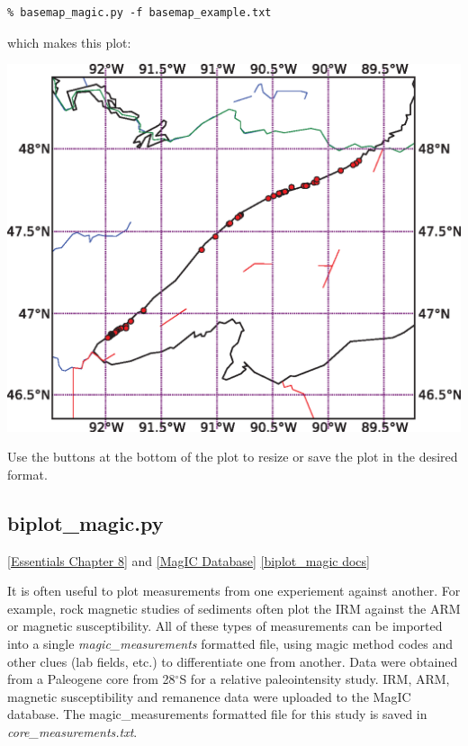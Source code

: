 \documentclass[11pt]{book}
\begin{document}
{{\begin{verbatim}
% basemap_magic.py -f basemap_example.txt
\end{verbatim}

\noindent which makes this plot:




\includegraphics[width=15cm]{EPSfiles/basemap.eps}

  Use the buttons at the bottom of the plot to resize or save the plot in the desired format.



\subsection{biplot\_magic.py}
\label{ex:biplot_magic}
\href{http://earthref.org/MAGIC/books/Tauxe/Essentials/WebBook3ch8.html#ch8}{
[Essentials Chapter 8]} and \href{#MagICDatabase}{[MagIC Database]}
\href{https://github.com/PmagPy/PmagPy/blob/master/programs/biplot_magic.py}{[biplot\_magic docs]}

It is often useful to plot measurements from one experiement against another.  For example, rock magnetic studies of sediments often plot the IRM against the ARM or magnetic susceptibility.  All of these types of measurements can be imported into a single {\it magic\_measurements} formatted file, using magic method codes and other clues (lab fields, etc.) to differentiate one from another.
Data  were obtained from a Paleogene core from 28$^{\circ}$S for a relative paleointensity study.    IRM, ARM, magnetic susceptibility and remanence data were uploaded to the MagIC database.  The magic\_measurements formatted file for this study is saved in {\it core\_measurements.txt}.

}}
\end{document}
